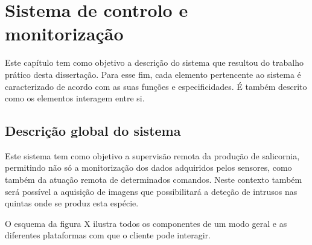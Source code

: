 

\chapter{Sistema de controlo e monitorização}


Este capítulo tem como objetivo a descrição do sistema que resultou do trabalho prático
desta dissertação. Para esse fim, cada elemento pertencente ao sistema é caracterizado de
acordo com as suas funções e especificidades. É também descrito como os elementos interagem
entre si.










\section{Descrição global do sistema}


Este sistema tem como objetivo a supervisão remota da produção de salicornia,  permitindo não só a monitorização dos dados adquiridos pelos sensores, como também da atuação remota de determinados comandos. Neste contexto também será possível a aquisição de imagens que possibilitará a deteção de intrusos nas quintas onde se produz esta espécie.

O esquema da figura X ilustra todos os componentes de um modo geral e as diferentes plataformas com que o cliente pode interagir. 






